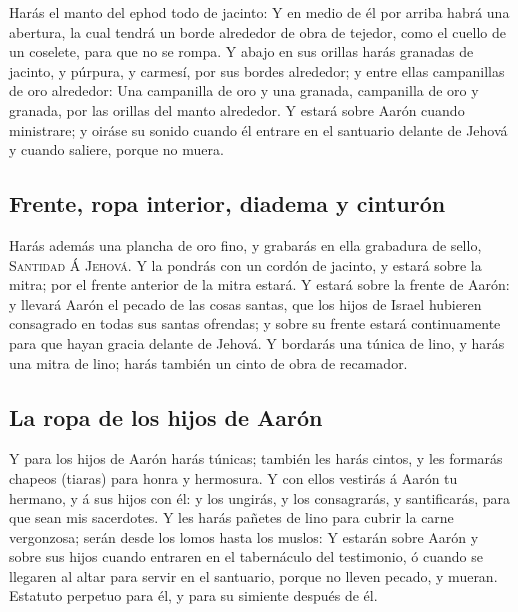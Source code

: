  Harás el manto del ephod todo de jacinto:
 Y en medio de él por arriba habrá una abertura, la cual
tendrá un borde alrededor de obra de tejedor, como el cuello de un
coselete, para que no se rompa.  Y abajo en sus orillas
harás granadas de jacinto, y púrpura, y carmesí, por sus bordes
alrededor; y entre ellas campanillas de oro alrededor: 
Una campanilla de oro y una granada, campanilla de oro y granada, por
las orillas del manto alrededor.  Y estará sobre Aarón
cuando ministrare; y oiráse su sonido cuando él entrare en el santuario
delante de Jehová y cuando saliere, porque no muera.

\hypertarget{frente-ropa-interior-diadema-y-cinturuxf3n}{%
\subsection{Frente, ropa interior, diadema y
cinturón}\label{frente-ropa-interior-diadema-y-cinturuxf3n}}

 Harás además una plancha de oro fino, y grabarás en ella
grabadura de sello, \textsc{Santidad} Á \textsc{Jehová}. 
Y la pondrás con un cordón de jacinto, y estará sobre la mitra; por el
frente anterior de la mitra estará.  Y estará sobre la
frente de Aarón: y llevará Aarón el pecado de las cosas santas, que los
hijos de Israel hubieren consagrado en todas sus santas ofrendas; y
sobre su frente estará continuamente para que hayan gracia delante de
Jehová.  Y bordarás una túnica de lino, y harás una mitra
de lino; harás también un cinto de obra de recamador.

\hypertarget{la-ropa-de-los-hijos-de-aaruxf3n}{%
\subsection{La ropa de los hijos de
Aarón}\label{la-ropa-de-los-hijos-de-aaruxf3n}}

 Y para los hijos de Aarón harás túnicas; también les
harás cintos, y les formarás chapeos (tiaras) para honra y hermosura.
 Y con ellos vestirás á Aarón tu hermano, y á sus hijos
con él: y los ungirás, y los consagrarás, y santificarás, para que sean
mis sacerdotes.  Y les harás pañetes de lino para cubrir
la carne vergonzosa; serán desde los lomos hasta los muslos:
 Y estarán sobre Aarón y sobre sus hijos cuando entraren
en el tabernáculo del testimonio, ó cuando se llegaren al altar para
servir en el santuario, porque no lleven pecado, y mueran. Estatuto
perpetuo para él, y para su simiente después de él.

